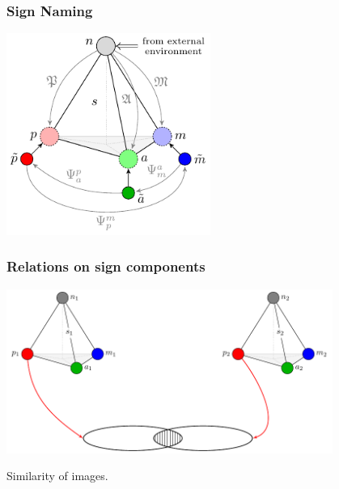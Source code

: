 \documentclass[default]{beamer}
\begin{document}
	\begin{frame}
		\frametitle{Sign Naming}
		\centering
		\includegraphics[width=0.5\textwidth]{signs/sign_naming_colored_en}
	\end{frame}		

	\begin{frame}
		\frametitle{Relations on sign components}
		\centering
		\includegraphics[page=1,width=0.8\textwidth]{signs/sign_relations}
		
		Similarity of images.
	\end{frame}	
\end{document}
